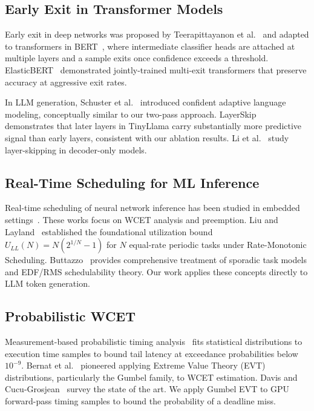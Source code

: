 \documentclass[conference]{IEEEtran}
\begin{document}
\subsection{Early Exit in Transformer Models}

Early exit in deep networks was proposed by Teerapittayanon et al.~\cite{teerapittayanon2016branchynet} and adapted to transformers in BERT~\cite{liu2020fastbert,xin2020deebert}, where intermediate classifier heads are attached at multiple layers and a sample exits once confidence exceeds a threshold. ElasticBERT~\cite{liu2021elasticbert} demonstrated jointly-trained multi-exit transformers that preserve accuracy at aggressive exit rates.

In LLM generation, Schuster et al.~\cite{schuster2022confident} introduced confident adaptive language modeling, conceptually similar to our two-pass approach. LayerSkip~\cite{elhoushi2024layerskip} demonstrates that later layers in TinyLlama carry substantially more predictive signal than early layers, consistent with our ablation results. Li et al.~\cite{li2023accelerating} study layer-skipping in decoder-only models.

\subsection{Real-Time Scheduling for ML Inference}

Real-time scheduling of neural network inference has been studied in embedded settings~\cite{bateni2020neuos,xiang2019pipelined}. These works focus on WCET analysis and preemption. Liu and Layland~\cite{liu1973scheduling} established the foundational utilization bound $U_{LL}(N) = N(2^{1/N}-1)$ for $N$ equal-rate periodic tasks under Rate-Monotonic Scheduling. Buttazzo~\cite{buttazzo2011hard} provides comprehensive treatment of sporadic task models and EDF/RMS schedulability theory. Our work applies these concepts directly to LLM token generation.

\subsection{Probabilistic WCET}

Measurement-based probabilistic timing analysis~\cite{cucu2012measurement} fits statistical distributions to execution time samples to bound tail latency at exceedance probabilities below $10^{-9}$. Bernat et al.~\cite{bernat2002wcet} pioneered applying Extreme Value Theory (EVT) distributions, particularly the Gumbel family, to WCET estimation. Davis and Cucu-Grosjean~\cite{davis2013quantifying} survey the state of the art. We apply Gumbel EVT to GPU forward-pass timing samples to bound the probability of a deadline miss.
\end{document}
